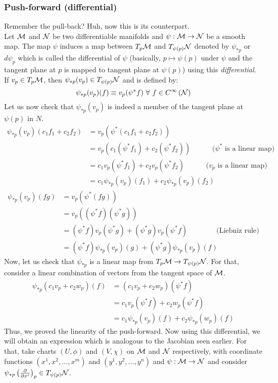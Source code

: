 \subsubsection{Push-forward (differential)}
Remember the pull-back? Huh, now this is its counterpart.\\[0.2cm]
Let $\mathcal M$ and $\mathcal N$ be two differentiable manifolds and $\psi: \mathcal M\rightarrow \mathcal N$ be a smooth map. The map $\psi$ induces a map between $T_p\mathcal M$ and $T_{\psi(p)}\mathcal N$ denoted by $\psi_{*p}$ or $d\psi_p$ which is called the differential of $\psi$ (basically, $p \mapsto \psi(p)$ under $\psi$ and the tangent plane at $p$ is mapped to tangent plane at $\psi(p)$) using this \textit{differential}. If $v_p\in T_p\mathcal M$, then $\psi_{*p}(v_p)\in T_{\psi(p)}\mathcal N$ and is defined by:
$$\psi_{*p}(v_p)(f) \equiv v_p(\psi^* f)\ \forall \ f\in \cty{\SN}$$
Let us now check that $\psi_{*p}(v_p)$ is indeed a member of the tangent plane at $\psi(p)$ in $N$. 
\begin{align*}
  \psi_{*p}(v_p)(c_1f_1 + c_2f_2) &= v_p(\psi^*(c_1f_1+c_2f_2))\\
  &=v_p(c_1(\psi^*f_1) + c_2(\psi^*f_2)) \qquad\quad \text{($\psi^*$ is a linear map)}\\
  &=c_1v_p(\psi^*f_1) + c_2 v_p(\psi^*f_2) \qquad\quad \text{($v_p$ is a linear map)}\\
  &=c_1 \psi_{*p}(v_p)(f_1)+c_2 \psi_{*p}(v_p)(f_2)
\end{align*}%
\begin{align*}
  \psi_{*p}(v_p)(fg) &= v_p(\psi^*(fg))\\
  &=v_p((\psi^*f)(\psi^*g))\\
  &=(\psi^*f)v_p(\psi^*g) +(\psi^*g)v_p(\psi^*f) \qquad\qquad \text{(Liebniz rule)}\\
  &= (\psi^*f)\psi_{*p}(v_p)(g) + (\psi^*g)\psi_{*p}(v_p)(f)
\end{align*}
Now, let us check that $\psi_{*p}$ is a linear map from $T_p\mathcal M \rightarrow T_{\psi(p)}\mathcal N$. For that, consider a linear combination of vectors from the tangent space of $\mathcal M$. 
\begin{align*}
  \psi_{*p}(c_1 v_{p}+c_2 w_p)(f) &=(c_1 v_{p}+c_2 w_p)(\psi^* f)\\
&=c_1v_p(\psi^*f) + c_2w_p(\psi^*f)\\
&=c_1 \psi_{*p}(v_p)(f)+c_2 \psi_{*p}(w_p)(f)
\end{align*}
Thus, we proved the linearity of the push-forward. Now using this differential, we will obtain an expression which is analogous to the Jacobian seen earlier. For that, take charts $(U,\phi)$ and $(V,\chi)$ on $\mathcal M$ and $\mathcal N$ respectively, with coordinate functions $(x^1, x^2,\ldots, x^m)$ and $(y^1, y^2,\ldots, y^n)$ and $\psi: \mathcal M\rightarrow \mathcal N$ and consider $\psi_{*p}\left( \pdv{x^i} \right)_p \in T_{\psi(p)}\mathcal N$. 
